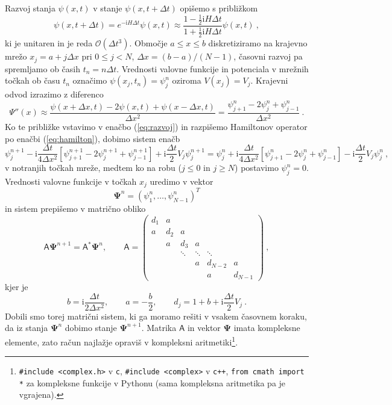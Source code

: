 \documentclass[slovene,11pt,a4paper]{article}
\newcommand{\ii}{\mathrm{i}}
\newcommand{\thalf}{\tfrac{1}{2}}
\begin{document}
Razvoj stanja $\psi(x,t)$ v stanje $\psi(x,t+\Delta t)$ opišemo s približkom
\begin{equation}
  \psi(x,t+\Delta t)=e^{-\ii H \Delta t} \psi(x,t)\approx \frac{1-\thalf \ii H \Delta t}{1+\thalf \ii H \Delta t}\psi(x,t)\>,
  \label{eq:razvoj}
\end{equation}
ki je unitaren in je reda $\mathcal{O}(\Delta t^3)$. Območje $a\leq x\leq b$ diskretiziramo na krajevno mrežo $x_j=a+j\Delta x$ pri $0\leq j<N$, $\Delta x = (b-a)/(N-1)$, časovni razvoj pa spremljamo ob časih $t_n=n\Delta t$. Vrednosti valovne funkcije in potenciala v mrežnih točkah ob času $t_n$ označimo $\psi(x_j,t_n)=\psi_j^n$ oziroma $V(x_j)=V_j$. Krajevni odvod izrazimo z diferenco
\begin{equation*}
  \Psi''(x)\approx \frac{\psi(x+\Delta x,t)-2\psi(x,t)+\psi(x-\Delta x,t)}{\Delta x^2}=\frac{\psi_{j+1}^n - 2\psi_j^n+\psi_{j-1}^n}{\Delta x^2}\>.
\end{equation*}
Ko te približke vstavimo v enačbo (\ref{eq:razvoj}) in razpišemo Hamiltonov operator po enačbi (\ref{eq:hamilton}), dobimo sistem enačb
\begin{equation*}
  \psi_j^{n+1}-\ii\frac{\Delta t}{4\Delta x^2}\left[\psi_{j+1}^{n+1}-2\psi_j^{n+1}+\psi_{j-1}^{n+1}\right] + \ii\frac{\Delta t}{2}V_j \psi_j^{n+1}=  \psi_j^{n}+\ii\frac{\Delta t}{4\Delta x^2}\left[\psi_{j+1}^{n}-2\psi_j^{n}+\psi_{j-1}^{n}\right] - \ii\frac{\Delta t}{2}V_j \psi_j^{n}\>,
\end{equation*}
v notranjih točkah mreže, medtem ko na robu ($j\leq 0$ in $j\geq N$) postavimo $\psi_j^n=0$. Vrednosti valovne funkcije v točkah $x_j$ uredimo v vektor
\begin{equation*}
\boldsymbol{\Psi}^n=(\psi_1^n,\ldots,\psi_{N-1}^n)^T
\end{equation*}
in sistem prepišemo v matrično obliko
\begin{equation*}
  \mathsf{A}\boldsymbol{\Psi}^{n+1}=\mathsf{A}^\ast \boldsymbol{\Psi}^n,\qquad
  \mathsf{A}=\begin{pmatrix}
  d_1 & a \\
  a   & d_2 & a \\
  & a & d_3 & a \\
  & & \ddots & \ddots & \ddots \\
  & & & a & d_{N-2} & a \\
  & & & & a & d_{N-1}
  \end{pmatrix}\>,
\end{equation*}
kjer je
\begin{equation*}
  b=\ii \frac{\Delta t}{2 \Delta x^2},\qquad a=-\frac{b}{2},\qquad d_j = 1+b+\ii \frac{\Delta t}{2}V_j\>.
\end{equation*}
Dobili smo torej matrični sistem, ki ga moramo rešiti v vsakem časovnem koraku, da iz stanja $\boldsymbol{\Psi}^n$ dobimo stanje $\boldsymbol{\Psi}^{n+1}$. Matrika $\mathsf{A}$ in vektor $\boldsymbol{\Psi}$ imata kompleksne elemente, zato račun najlažje opraviš v kompleksni aritmetiki\footnote{
  {\tt \#include <complex.h>} v {\tt c}, {\tt \#include <complex>} v {\tt c++}, {\tt from cmath import *} za kompleksne funkcije v Pythonu (sama kompleksna aritmetika pa je vgrajena).
}.
\end{document}
